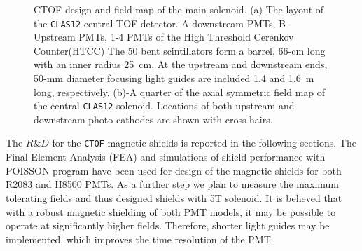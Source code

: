\documentclass[12pt]{article}
\begin{document}
\begin{figure}[htbp]
\centering
{}
\qquad
{}
\caption{\small{CTOF design and field map of the main solenoid. 
(a)-The layout of the {\tt CLAS12} central TOF detector.
A-downstream PMTs, B-Upstream PMTs, 1-4 PMTs of the High Threshold Cerenkov Counter(HTCC)  
The 50 bent scintillators form a barrel,
66-cm long with an inner radius 25~cm. 
At the upstream and downstream ends, 50-mm diameter focusing light guides are 
included 1.4 and  1.6~m long, respectively.
(b)-{A quarter of the axial symmetric field map of 
the central {\tt CLAS12} solenoid. Locations of both upstream and downstream
photo cathodes  are shown with cross-hairs.}
\label{fig:ctofmap}}}
\end{figure}
%
The $R\&D$ for the {\tt CTOF} magnetic shields is reported in the following sections.
The Final Element Analysis (FEA) and simulations of shield performance
with POISSON program  have been used for 
design of the magnetic shields for both R2083 and H8500 PMTs.
As a further step  we  plan to  measure the maximum tolerating fields and thus 
designed shields with 5T solenoid.  It is believed that with a robust magnetic shielding of both PMT  models, it may be possible to operate at significantly higher fields. Therefore, shorter light guides may  be implemented, which improves the time resolution of the PMT.
%
\end{document}
